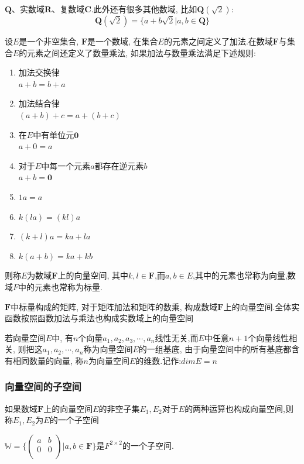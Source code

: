 \documentclass[a4paper,11pt]{article}
\theoremstyle{mystyle}
\begin{document}
$\mathbf{Q}$、实数域$\mathbf{R}$、复数域$\mathbf{C}$.此外还有很多其他数域, 比如$\mathbf{Q}(\sqrt{2})$:
\begin{equation*}
  \mathbf{Q}(\sqrt{2})=\{a+b\sqrt{2}|a,b\in\mathbf{Q}\}
\end{equation*}
\begin{definition}[向量空间]
  设$E$是一个非空集合, $\mathbf{F}$是一个数域, 在集合$E$的元素之间定义了加法.在数域$\mathbf{F}$与集合$E$的元素之间还定义了数量乘法, 如果加法与数量乘法满足下述规则:
  \begin{enumerate}[(1)]
    \item 加法交换律\\$a+b=b+a$
    \item 加法结合律\\$(a+b)+c=a+(b+c)$
    \item 在$E$中有单位元$\mathbf{0}$\\$a+0=a$
    \item 对于$E$中每一个元素$a$都存在逆元素$b$\\$a+b=\mathbf{0}$
    \item $1a=a$
    \item $k(la)=(kl)a$
    \item $(k+l)a=ka+la$
    \item $k(a+b)=ka+kb$
  \end{enumerate}
  则称$E$为数域$\mathbf{F}$上的向量空间, 其中$k,l\in \mathbf{F}$,而$a,b\in E$,其中的元素也常称为向量,数域$F$中的元素也常称为标量.
\end{definition}
$\mathbf{F}$中标量构成的矩阵, 对于矩阵加法和矩阵的数乘, 构成数域$\mathbf{F}$上的向量空间.全体实函数按照函数加法与乘法也构成实数域上的向量空间
\begin{definition}[向量空间的基]
  若向量空间$E$中, 有$n$个向量$a_1,a_2,a_3,\cdots,a_n$线性无关,而$E$中任意$n+1$个向量线性相关, 则把这$a_1,a_2,\cdots,a_n$称为向量空间$E$的一组基底, 由于向量空间中的所有基底都含有相同数量的向量, 称$n$为向量空间$E$的维数.记作:$dimE=n$
\end{definition}
\subsubsection*{向量空间的子空间}
\begin{definition}[子空间]
  如果数域$\mathbf{F}$上的向量空间$E$的非空子集$E_1,E_2$对于$E$的两种运算也构成向量空间,则称$E_1,E_2$为$E$的一个子空间
\end{definition}
$\mathbb{W}=\{\begin{pmatrix}
                       a & b \\
                       0 & 0 \\
                     \end{pmatrix}
|a,b\in \mathbf{F}\}$是$F^{2\times 2}$的一个子空间.
\end{document}
